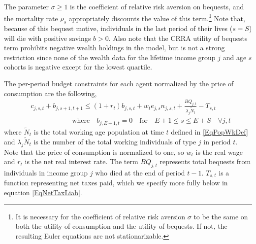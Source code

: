 \documentclass[letterpaper,12pt]{article}
\theoremstyle{definition}
\begin{document}
\begin{spacing}{1.5}
    The parameter $\sigma\geq 1$ is the coefficient of relative risk aversion on bequests, and the mortality rate $\rho_s$ appropriately discounts the value of this term.\footnote{It is necessary for the coefficient of relative risk aversion $\sigma$ to be the same on both the utility of consumption and the utility of bequests. If not, the resulting Euler equations are not stationarizable.} Note that, because of this bequest motive, individuals in the last period of their lives ($s=S$) will die with positive savings $b>0$. Also note that the CRRA utility of bequests term prohibits negative wealth holdings in the model, but is not a strong restriction since none of the wealth data for the lifetime income group $j$ and age $s$ cohorts is negative except for the lowest quartile.

    The per-period budget constraints for each agent normalized by the price of consumption are the following,
    \begin{equation}\label{EqBC}
      \begin{split}
        &c_{j,s,t} + b_{j,s+1,t+1} \leq \left(1 + r_t\right) b_{j,s,t} + w_t e_{j,s}n_{j,s,t} + \frac{BQ_{j,t}}{\lambda_j\tilde{N}_t} - T_{s,t} \\
        &\qquad\qquad\qquad\text{where}\quad b_{j,E+1,t} = 0\quad\text{for} \quad E+1\leq s \leq E+S \quad \forall j,t
      \end{split}
    \end{equation}
    where $\tilde{N}_t$ is the total working age population at time $t$ defined in \eqref{EqPopWkDef} and $\lambda_j\tilde{N}_t$ is the number of the total working individuals of type $j$ in period $t$. Note that the price of consumption is normalized to one, so $w_t$ is the real wage and $r_t$ is the net real interest rate. The term $BQ_{j,t}$ represents total bequests from individuals in income group $j$ who died at the end of period $t-1$. $T_{s,t}$ is a function representing net taxes paid, which we specify more fully below in equation \eqref{EqNetTaxLiab}.


\end{spacing}
\end{document}
